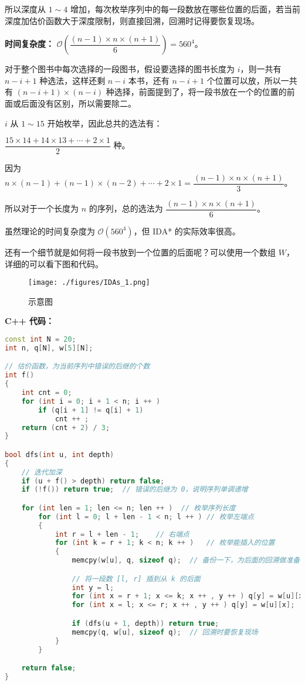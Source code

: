 所以深度从 $1 \sim 4$ 增加，每次枚举序列中的每一段数放在哪些位置的后面，若当前深度加估价函数大于深度限制，则直接回溯，回溯时记得要恢复现场。

\textbf{时间复杂度：} $\mathcal{O}(\dfrac{(n - 1) \times n \times (n + 1)}{6}) = 560^4$。

对于整个图书中每次选择的一段图书，假设要选择的图书长度为 $i$，则一共有 $n - i + 1$ 种选法，这样还剩 $n - i$ 本书，还有 $n - i + 1$ 个位置可以放，所以一共有 $(n - i + 1) \times (n - i)$ 种选择，前面提到了，将一段书放在一个的位置的前面或后面没有区别，所以需要除二。

$i$ 从 $1 \sim 15$ 开始枚举，因此总共的选法有：

$\dfrac{15 \times 14 + 14 \times 13 + \cdots + 2 \times 1}{2}$ 种。

因为 $n \times (n - 1) + (n - 1) \times (n - 2) + \cdots + 2 \times 1 = \dfrac{(n - 1) \times n \times (n + 1)}{3}$。

所以对于一个长度为 $n$ 的序列，总的选法为 $\dfrac{(n - 1) \times n \times (n + 1)}{6}$。

虽然理论的时间复杂度为 $\mathcal{O}(560^4)$，但 IDA* 的实际效率很高。

还有一个细节就是如何将一段书放到一个位置的后面呢？可以使用一个数组 $W$，详细的可以看下图和代码。

\begin{figure}[ht]
\centering
\texttt{[image: ./figures/IDAs\_1.png]}
\caption{示意图} \label{IDAs_fig1}
\end{figure}

\textbf{C++ 代码：}

\begin{lstlisting}[language=cpp]
const int N = 20;
int n, q[N], w[5][N];

// 估价函数，为当前序列中错误的后继的个数
int f()
{
    int cnt = 0;
    for (int i = 0; i + 1 < n; i ++ )
        if (q[i + 1] != q[i] + 1)
            cnt ++ ;
    return (cnt + 2) / 3;
}

bool dfs(int u, int depth)
{
    // 迭代加深
    if (u + f() > depth) return false;
    if (!f()) return true;  // 错误的后继为 0，说明序列单调递增

    for (int len = 1; len <= n; len ++ )  // 枚举序列长度
        for (int l = 0; l + len - 1 < n; l ++ ) // 枚举左端点
        {
            int r = l + len - 1;    // 右端点
            for (int k = r + 1; k < n; k ++ )   // 枚举能插入的位置
            {
                memcpy(w[u], q, sizeof q);  // 备份一下，为后面的回溯做准备

                // 将一段数 [l, r] 插到从 k 的后面
                int y = l;  
                for (int x = r + 1; x <= k; x ++ , y ++ ) q[y] = w[u][x];
                for (int x = l; x <= r; x ++ , y ++ ) q[y] = w[u][x];

                if (dfs(u + 1, depth)) return true;
                memcpy(q, w[u], sizeof q);  // 回溯时要恢复现场
            }
        }

    return false;
}
\end{lstlisting}